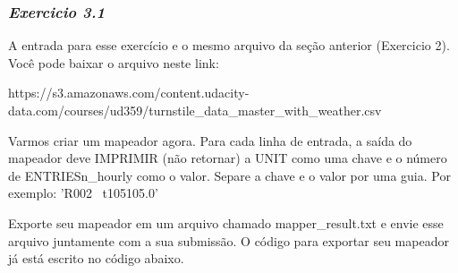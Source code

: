 \documentclass[11pt]{article}
\begin{document}
\subsubsection{\texorpdfstring{\emph{Exercicio
3.1}}{Exercicio 3.1}}\label{exercicio-3.1}

A entrada para esse exercício e o mesmo arquivo da seção anterior
(Exercicio 2). Você pode baixar o arquivo neste link:

https://s3.amazonaws.com/content.udacity-data.com/courses/ud359/turnstile\_data\_master\_with\_weather.csv

Varmos criar um mapeador agora. Para cada linha de entrada, a saída do
mapeador deve IMPRIMIR (não retornar) a UNIT como uma chave e o número
de ENTRIESn\_hourly como o valor. Separe a chave e o valor por uma guia.
Por exemplo: 'R002 ~t105105.0'

Exporte seu mapeador em um arquivo chamado mapper\_result.txt e envie
esse arquivo juntamente com a sua submissão. O código para exportar seu
mapeador já está escrito no código abaixo.
\end{document}
